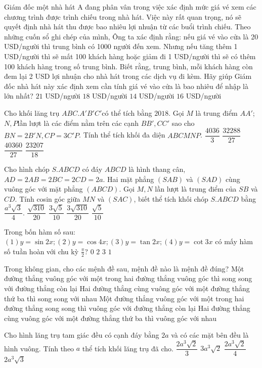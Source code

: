 \begin{ex}%
 Giám đốc một nhà hát A đang phân vân trong việc xác định mức giá vé xem các chương trình được trình chiếu trong nhà hát. Việc này rất quan trọng, nó sẽ quyết định nhà hát thu được bao nhiêu lợi nhuận từ các buổi trình chiếu. Theo những cuốn sổ ghi chép của mình, Ông ta xác định rằng: nếu giá vé vào cửa là 20 USD/người thì trung bình có 1000 người đến xem. Nhưng nếu tăng thêm 1 USD/người thì sẽ mất 100 khách hàng hoặc giảm đi 1 USD/người thì sẽ có thêm 100 khách hàng trong số trung bình. Biết rằng, trung bình, mỗi khách hàng còn đem lại 2 USD lợi nhuận cho nhà hát trong các dịch vụ đi kèm. Hãy giúp Giám đốc nhà hát này xác định xem cần tính giá vé vào cửa là bao nhiêu để nhập là lớn nhất?
\choice
{$21$ USD/người}
{$18$ USD/người}
{\True $14$ USD/người}
{$16$ USD/người}
\end{ex}
\begin{ex}%
 Cho khối lăng trụ $ABC.{A}'{B}'{C}'$có thể tích bằng $2018$. Gọi $M $ là trung điểm $AA'$; $N, P $lần lượt là các điểm nằm trên các cạnh $BB',CC'$  sao cho $BN=2B'N,  CP=3C'P$. Tính thể tích khối đa diện $ABCMNP$.
\choice
{$\dfrac{4036}{3}$}
{$\dfrac{32288}{27}$}
{$\dfrac{40360}{27}$}
{\True $\dfrac{23207}{18}$}
\end{ex}
\begin{ex}%
 Cho hình chóp $S.ABCD$ có đáy $ABCD$ là hình thang cân, $AD=2AB=2BC=2CD=2a$. Hai mặt phẳng $(SAB)$ và $(SAD)$ cùng vuông góc với mặt phẳng $(ABCD)$. Gọi $M,  N$ lần lượt là trung điểm của $SB$ và $CD$. Tính cosin góc giữa $MN$ và $\left(SAC\right)$, biết thể tích khối chóp $S.ABCD$ bằng $\dfrac{a^3\sqrt{3}}{4}$.
\choice
{\True $\dfrac{\sqrt{310}}{20}$}
{$\dfrac{3\sqrt{5}}{10}$}
{$\dfrac{3\sqrt{310}}{20}$}
{$\dfrac{\sqrt{5}}{10}$}
\end{ex}
\begin{ex}%
  Trong bốn hàm số sau:$(1)  y=\sin 2x;  (2)  y=\cos 4x;  (3) y=\tan 2x;  (4)  y=\cot 3x$ có mấy hàm số tuần hoàn với chu kỳ $\frac{\pi}{2}$?
\choice
{$0$}
{\True $2$}
{$3$}
{$1$}
\end{ex}
\begin{ex} %
Trong không gian, cho các mệnh đề sau, mệnh đề nào là mệnh đề đúng?
\choice
{Một đường thẳng vuông góc với một trong hai đường thẳng vuông góc thì song song với đường thẳng còn lại}
{Hai đường thẳng cùng vuông góc với một đường thẳng thứ ba thì song song với nhau}
{\True Một đường thẳng vuông góc với một trong hai đường thẳng song song thì vuông góc với đường thẳng còn lại}
{Hai đường thẳng cùng vuông góc với một đường thẳng thứ ba thì vuông góc với nhau}
\end{ex}
\begin{ex} %
Cho hình lăng trụ tam giác đều có cạnh đáy bằng $2a$ và có các mặt bên đều là hình vuông. Tính theo $a$ thể tích khối lăng trụ đã cho.
\choice
{$\dfrac{2a^3\sqrt{2}}{3}$}
{$3a^3\sqrt{2}$}
{$\dfrac{2a^3\sqrt{2}}{4}$}
{\True $2a^3\sqrt{3}$}
\end{ex}


